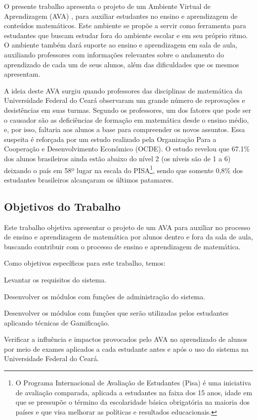 O presente trabalho apresenta o projeto de um Ambiente Virtual de Aprendizagem (AVA) \cite{valentini2010aprendizagem}, para auxiliar estudantes no ensino e aprendizagem de conteúdos matemáticos. Este 
ambiente se propõe a servir como ferramenta para estudantes que buscam estudar fora do ambiente escolar e em seu próprio ritmo. O ambiente também dará suporte ao ensino e aprendizagem em sala de 
aula, auxiliando professores com informações relevantes sobre o andamento do aprendizado de cada um de seus alunos, além das dificuldades que os mesmos apresentam.

A ideia deste AVA surgiu quando professores das disciplinas de matemática da Universidade Federal do Cear\'a observaram um grande número de reprovações e desistências em suas turmas. Segundo os professores, um dos fatores que pode ser o causador são as deficiências de formação em matemática desde o ensino médio, e, por isso, faltaria aos alunos a base para compreender os novos assuntos. Essa suspeita é reforçada por um estudo realizado pela Organização Para a Cooperação e Desenvolvimento Econômico (OCDE)\cite{pisainfocus2016}. O estudo revelou que 67.1\% dos alunos brasileiros ainda estão abaixo do nível 2 (os níveis são de 1 a 6) deixando o país em 58º lugar na escala do PISA\footnote{O Programa Internacional de Avaliação de Estudantes (Pisa) é uma iniciativa de avaliação comparada, aplicada a estudantes na faixa dos 15 anos, idade em que se pressupõe o término da escolaridade básica obrigatória na maioria dos países e que visa melhorar as políticas e resultados educacionais.}, sendo que somente 0,8\% dos estudantes brasileiros alcançaram os últimos patamares.

\subsection{Objetivos do Trabalho}

Este trabalho objetiva apresentar o projeto de um AVA para auxiliar no processo de ensino e aprendizagem de matemática por alunos dentro e fora da sala de aula, buscando contribuir com o 
processo de ensino e aprendizagem de matem\'atica. 

Como objetivos específicos para este trabalho, temos: 
\begin{alineas}
	\item Levantar os requisitos do sistema.
	\item Desenvolver os módulos com funções de administração do sistema.
    \item Desenvolver os módulos com funções que serão utilizadas pelos estudantes aplicando técnicas de Gamificação.
    \item Verificar a influência e impactos provocados pelo AVA no aprendizado de alunos por meio de exames aplicados a cada estudante antes e após o uso do sistema na Universidade Federal do Ceará.
\end{alineas}


